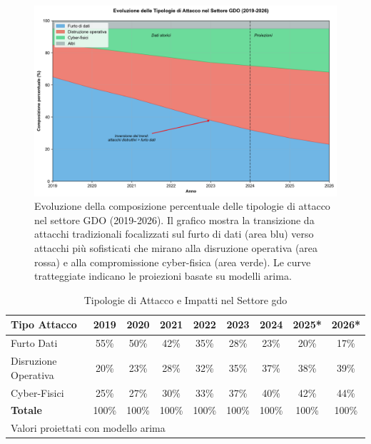 \begin{figure}[htbp]
\centering
\includegraphics[width=1\textwidth]{thesis_figures/cap1/fig_evoluzione_attacchi.png}
\caption{Evoluzione della composizione percentuale delle tipologie di attacco nel settore GDO (2019-2026). Il grafico mostra la transizione da attacchi tradizionali focalizzati sul furto di dati (area blu) verso attacchi più sofisticati che mirano alla disruzione operativa (area rossa) e alla compromissione cyber-fisica (area verde). Le curve tratteggiate indicano le proiezioni basate su modelli \gls{arima}.}
\label{fig:evoluzione_attacchi}
\end{figure}

\begin{table}[htbp]
\centering
\small
\caption{Tipologie di Attacco e Impatti nel Settore \gls{gdo}}
\label{tab:threat_evolution}
\begin{tabular}[width=0.8\textwidth]{lcccccccc}
\toprule
\textbf{Tipo Attacco} & \textbf{2019} & \textbf{2020} & \textbf{2021} & \textbf{2022} & \textbf{2023} & \textbf{2024} & \textbf{2025*} & \textbf{2026*}\\
\midrule
Furto Dati & 55\% & 50\% & 42\% & 35\% & 28\% & 23\% & 20\% & 17\% \\
Disruzione Operativa & 20\% & 23\% & 28\% & 32\% & 35\% & 37\% & 38\% & 39\% \\
Cyber-Fisici & 25\% & 27\% & 30\% & 33\% & 37\% & 40\% & 42\% & 44\% \\
\midrule
\textbf{Totale} & 100\% & 100\% & 100\% & 100\% & 100\% & 100\% & 100\% & 100\% \\
\bottomrule
\multicolumn{9}{l}{\footnotesize * Valori proiettati con modello \gls{arima}}
\end{tabular}
\end{table}


